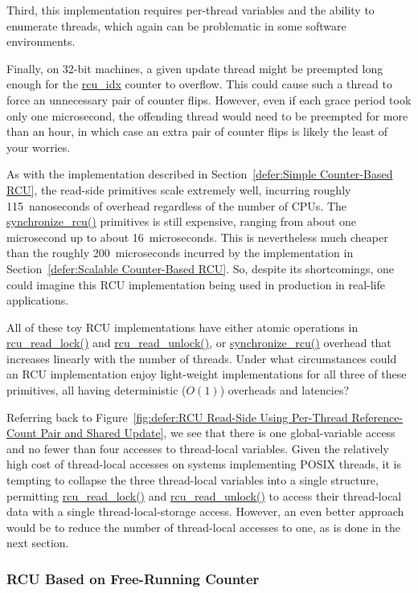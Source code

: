 Third, this implementation requires per-thread variables
and the ability to enumerate threads, which again can be
problematic in some software environments.

Finally, on 32-bit machines, a given update thread might be
preempted long enough for the \url{rcu_idx}
counter to overflow.
This could cause such a thread to force an unnecessary
pair of counter flips.
However, even if each grace period took only one
microsecond, the offending thread would need to be
preempted for more than an hour, in which case an
extra pair of counter flips is likely the least of
your worries.

As with the implementation described in
Section~\ref{defer:Simple Counter-Based RCU},
the read-side primitives scale extremely well, incurring roughly
115~nanoseconds of overhead regardless of the number of CPUs.
The \url{synchronize_rcu()} primitives is still expensive,
ranging from about one microsecond up to about 16~microseconds.
This is nevertheless much cheaper than the roughly 200~microseconds
incurred by the implementation in
Section~\ref{defer:Scalable Counter-Based RCU}.
So, despite its shortcomings, one could imagine this
RCU implementation being used in production in real-life applications.

\QuickQuiz{}
	All of these toy RCU implementations have either atomic operations
	in \url{rcu_read_lock()} and \url{rcu_read_unlock()},
	or \url{synchronize_rcu()}
	overhead that increases linearly with the number of threads.
	Under what circumstances could an RCU implementation enjoy
	light-weight implementations for all three of these primitives,
	all having deterministic ($O(1)$) overheads and latencies?
 \QuickQuizEnd

Referring back to
Figure~\ref{fig:defer:RCU Read-Side Using Per-Thread Reference-Count Pair and Shared Update},
we see that there is one global-variable access and no fewer than four
accesses to thread-local variables.
Given the relatively high cost of thread-local accesses on systems
implementing POSIX threads, it is tempting to collapse the three
thread-local variables into a single structure, permitting
\url{rcu_read_lock()} and \url{rcu_read_unlock()} to access their
thread-local data with a single thread-local-storage access.
However, an even better approach would be to reduce the number of
thread-local accesses to one, as is done in the next section.

\subsubsection{RCU Based on Free-Running Counter}
\label{defer:RCU Based on Free-Running Counter}


